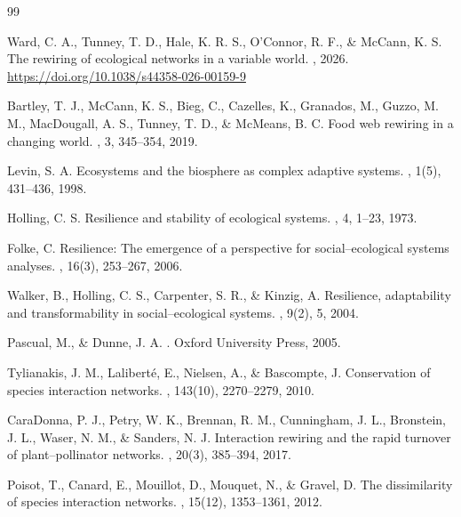 \documentclass[11pt,a4paper]{article}
\begin{document}
\begin{thebibliography}{99}

Ward, C. A., Tunney, T. D., Hale, K. R. S., O'Connor, R. F., \& McCann, K. S.
\newblock The rewiring of ecological networks in a variable world.
, 2026.
\newblock \url{https://doi.org/10.1038/s44358-026-00159-9}

Bartley, T. J., McCann, K. S., Bieg, C., Cazelles, K., Granados, M., Guzzo, M. M., MacDougall, A. S., Tunney, T. D., \& McMeans, B. C.
\newblock Food web rewiring in a changing world.
, 3, 345--354, 2019.

Levin, S. A.
\newblock Ecosystems and the biosphere as complex adaptive systems.
, 1(5), 431--436, 1998.

Holling, C. S.
\newblock Resilience and stability of ecological systems.
, 4, 1--23, 1973.

Folke, C.
\newblock Resilience: The emergence of a perspective for social--ecological systems analyses.
, 16(3), 253--267, 2006.

Walker, B., Holling, C. S., Carpenter, S. R., \& Kinzig, A.
\newblock Resilience, adaptability and transformability in social--ecological systems.
, 9(2), 5, 2004.

Pascual, M., \& Dunne, J. A.
.
\newblock Oxford University Press, 2005.

Tylianakis, J. M., Laliberté, E., Nielsen, A., \& Bascompte, J.
\newblock Conservation of species interaction networks.
, 143(10), 2270--2279, 2010.

CaraDonna, P. J., Petry, W. K., Brennan, R. M., Cunningham, J. L., Bronstein, J. L., Waser, N. M., \& Sanders, N. J.
\newblock Interaction rewiring and the rapid turnover of plant--pollinator networks.
, 20(3), 385--394, 2017.

Poisot, T., Canard, E., Mouillot, D., Mouquet, N., \& Gravel, D.
\newblock The dissimilarity of species interaction networks.
, 15(12), 1353--1361, 2012.


\end{thebibliography}
\end{document}
